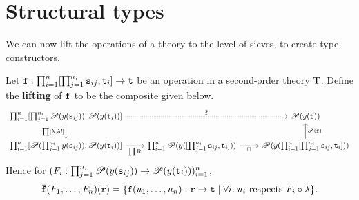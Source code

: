 \documentclass[stthol.tex]{subfiles}
\begin{document}
\section{Structural types}
\label{sec:stypes}

We can now lift the operations of a theory to the level of sieves, to create type constructors.

\begin{definition}
  \label{def:lift}
  Let $\mathtt{f}:\prod_{i=1}^n[\prod_{j=1}^{n_i}\mathtt{s}_{ij},\mathtt{t}_i]\to \mathtt{t}$ be an operation in a second-order theory $\mathrm{T}$. Define the \textbf{lifting} of $\mathtt{f}$ to be the composite given below.
  \[\begin{tikzcd}
      \prod_{i=1}^n [\prod_{j=1}^{n_i}\pow(y(\tts_{ij})),\pow(y(\ttt_i))] \arrow[d,"{\prod\left[\lambda,id\right]}",swap]
      \arrow[rr,"\ob{\ttf}",dotted] && \pow(y(\ttt))\\
      \prod_{i=1}^n [\pow(\prod_{j=1}^{n_i}y(\tts_{ij})),\pow(y(\ttt_i))]  \arrow[r,"\prod\mrm{R}",swap] &
      \prod_{i=1}^n \pow(y([\prod_{j=1}^{n_i}\tts_{ij},\ttt_i])) \arrow[r,"\sqcap",swap] &
      \pow(y(\prod_{i=1}^n[\prod_{j=1}^{n_i}\tts_{ij},\ttt_i]))  \arrow[u,"\pow(\ttf)",swap]
  \end{tikzcd}\]
Hence for $(F_i:\prod_{j=1}^{n_i}\mathscr{P}(y(\mathtt{s}_{ij}))\to \mathscr{P}(y(\mathtt{t}_i)))_{i=1}^n$,
$$\ob{\ttf}(F_1,\dots,F_n)(\ttrr) = \{\ttf(u_1,\dots,u_n):\ttrr\to \ttt\; |\; \forall i.\; u_i \text{ respects } F_i\circ \lambda\}.$$
\end{definition}

\end{document}
